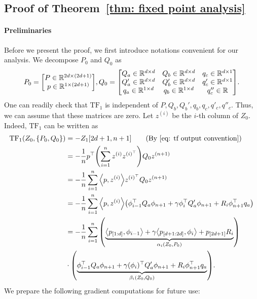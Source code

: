 \documentclass{article}
\newcommand{\explain}[1]{\tag*{(#1)}}
\newcommand{\R}{\mathbb{R}}
\newcommand{\indot}[2]{{\left<#1, #2\right>}}
\newcommand{\tf}{\text{TF}}
\newcommand{\paren}[1]{{\left(#1\right)}}
\begin{document}
\subsection{Proof of Theorem~\ref{thm: fixed point analysis}}
\label{sec proof thm: fixed point analysis}
\paragraph*{Preliminaries}
Before we present the proof, we first introduce notations convenient for our analysis.
We decompose $P_0$ and $Q_0$ as
\begin{align}
        P_0 = \mqty[P \in \R^{2d\times (2d+1)} \\ 
                 p \in \R^{1 \times (2d+1)}], 
        Q_0 = \mqty[Q_a \in \R^{d\times d} &  Q_b \in \R^{d\times d} & q_c \in \R^{d\times 1} \\ 
                  Q_a' \in \R^{d\times d} & Q_b' \in \R^{d\times d} & q_c' \in \R^{d\times 1}\\ 
                  q_a \in \R^{1\times d} &  q_b \in \R^{1\times d} & q_c'' \in \R].
\end{align}
One can readily check that $\tf_1$ is independent of $P, Q_b, Q_b', q_b, q_c ,q'_c, q''_c$. Thus, we can assume that these matrices are zero. 
Let $z^\paren{i}$ be the $i$-th column of $Z_0$. 
Indeed, $\tf_1$ can be written as 
 \begin{align}
        \tf_1(Z_0, \qty{P_0, Q_0})
        &= -Z_1\qty[2d+1,n+1] \explain{By \eqref{eq: tf output convention}}\\
        & = -\frac{1}{n} p^\top \qty(\sum_{i=1}^n z^{(i)} z^{(i)^\top})  Q_0 z^{(n+1)} \\
        & = -\frac{1}{n} \sum_{i=1}^n  \indot{p}{z^{(i)}} z^{(i)^\top} Q_0  z^{(n+1)}\\
        & = -\frac{1}{n} \sum_{i=1}^n \indot{p}{z^{(i)}} 
        \qty(\phi_{i-1}^\top Q_a \phi_{n+1} + \gamma\phi_{i}^\top Q_a' \phi_{n+1} + R_{i} \phi_{n+1}^\top q_a) \label{eq: tf1 block matrix vector form}\\
        & = -\frac{1}{n} \sum_{i=1}^n 
        \qty( \underbrace{\indot{p_{[1:d]}}{\phi_{i-1}} + \gamma \indot{p_{[d+1:2d]}}{\phi_i} + p_{[2d+1]} R_{i}}_{\alpha_i(Z_0, P_0)})\\
        & \cdot \qty(\underbrace{\phi_{i-1}^\top Q_a \phi_{n+1} + \gamma(\phi_i)^\top Q_a' \phi_{n+1} + R_i \phi_{n+1}^\top q_a}_{\beta_i(Z_0, Q_0)}).
    \end{align}
We prepare the following gradient computations for future use:
\end{document}
